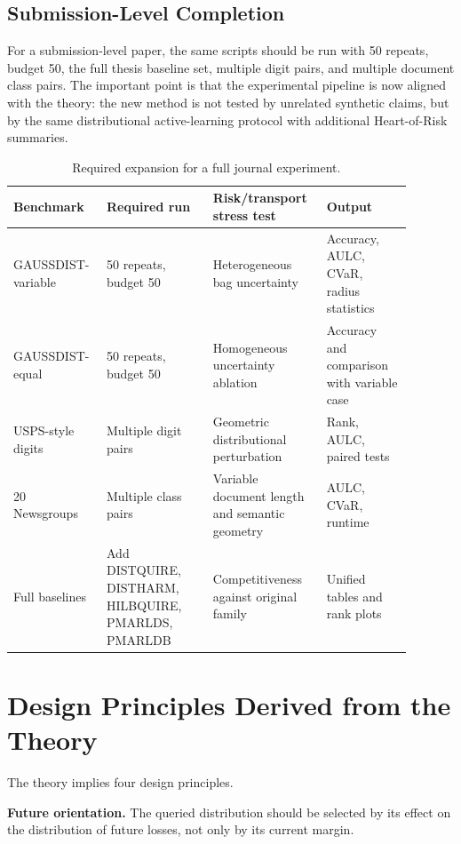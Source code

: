\documentclass[10pt,journal]{IEEEtran}
\begin{document}
\subsection{Submission-Level Completion}

For a submission-level paper, the same scripts should be run with 50 repeats, budget 50, the full thesis baseline set, multiple digit pairs, and multiple document class pairs. The important point is that the experimental pipeline is now aligned with the theory: the new method is not tested by unrelated synthetic claims, but by the same distributional active-learning protocol with additional Heart-of-Risk summaries.

\begin{table}[t]
\centering
\caption{Required expansion for a full journal experiment.}
\label{tab:required-expansion-v5}
\scriptsize
\setlength{\tabcolsep}{3pt}
\begin{tabular}{@{}p{0.18\linewidth}p{0.25\linewidth}p{0.26\linewidth}p{0.20\linewidth}@{}}
\toprule
Benchmark & Required run & Risk/transport stress test & Output \\
\midrule
GAUSSDIST-variable & 50 repeats, budget 50 & Heterogeneous bag uncertainty & Accuracy, AULC, CVaR, radius statistics \\
GAUSSDIST-equal & 50 repeats, budget 50 & Homogeneous uncertainty ablation & Accuracy and comparison with variable case \\
USPS-style digits & Multiple digit pairs & Geometric distributional perturbation & Rank, AULC, paired tests \\
20 Newsgroups & Multiple class pairs & Variable document length and semantic geometry & AULC, CVaR, runtime \\
Full baselines & Add DISTQUIRE, DISTHARM, HILBQUIRE, PMARLDS, PMARLDB & Competitiveness against original family & Unified tables and rank plots \\
\bottomrule
\end{tabular}
\end{table}

\section{Design Principles Derived from the Theory}
\label{sec:design-principles-v5}

The theory implies four design principles.

\textbf{Future orientation.} The queried distribution should be selected by its effect on the distribution of future losses, not only by its current margin.
\end{document}
